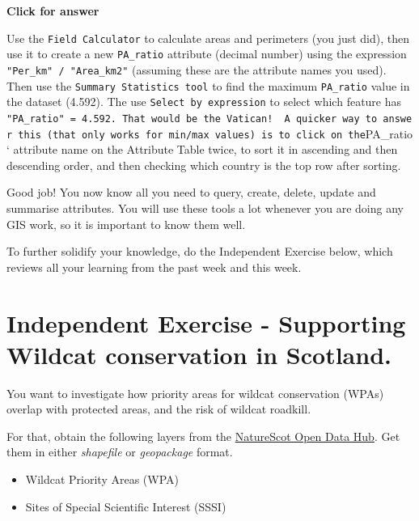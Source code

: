 \documentclass[
  letterpaper,
  DIV=11,
  numbers=noendperiod]{scrreprt}
\providecommand{\tightlist}{%
  \setlength{\itemsep}{0pt}\setlength{\parskip}{0pt}}\usepackage{longtable,booktabs,array}
\begin{document}
\begin{tcolorbox}[enhanced jigsaw, toprule=.15mm, breakable, left=2mm, colframe=quarto-callout-important-color-frame, colback=white, arc=.35mm, leftrule=.75mm, opacityback=0, rightrule=.15mm, bottomrule=.15mm]

\vspace{-3mm}\textbf{Click for answer}\vspace{3mm}

Use the \texttt{Field\ Calculator} to calculate areas and perimeters
(you just did), then use it to create a new \texttt{PA\_ratio} attribute
(decimal number) using the expression \texttt{"Per\_km"\ /\ "Area\_km2"}
(assuming these are the attribute names you used). Then use the
\texttt{Summary\ Statistics\ tool} to find the maximum
\texttt{PA\_ratio} value in the dataset (4.592). The use
\texttt{Select\ by\ expression} to select which feature has
\texttt{"PA\_ratio"\ =\ 4.592.\ That\ would\ be\ the\ Vatican!\ \ A\ quicker\ way\ to\ answer\ this\ (that\ only\ works\ for\ min/max\ values)\ is\ to\ click\ on\ the}PA\_ratio`
attribute name on the Attribute Table twice, to sort it in ascending and
then descending order, and then checking which country is the top row
after sorting.

\end{tcolorbox}

Good job! You now know all you need to query, create, delete, update and
summarise attributes. You will use these tools a lot whenever you are
doing any GIS work, so it is important to know them well.

To further solidify your knowledge, do the Independent Exercise below,
which reviews all your learning from the past week and this week.

\section{Independent Exercise - Supporting Wildcat conservation in
Scotland.}\label{independent-exercise---supporting-wildcat-conservation-in-scotland.}

You want to investigate how priority areas for wildcat conservation
(WPAs) overlap with protected areas, and the risk of wildcat roadkill.

For that, obtain the following layers from the
\href{https://opendata.nature.scot/}{NatureScot Open Data Hub}. Get them
in either \emph{shapefile} or \emph{geopackage} format.

\begin{itemize}
\tightlist
\item
  Wildcat Priority Areas (WPA)
\item
  Sites of Special Scientific Interest (SSSI)
\end{itemize}
\end{document}
